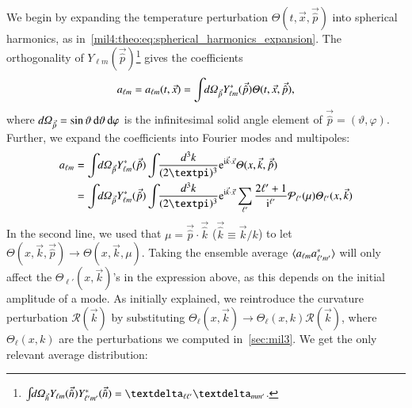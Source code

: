 We begin by expanding the temperature perturbation $\Theta(t, \vec{x}, \vec{\hat{p}})$ into spherical harmonics, as in~\cref{mil4:theo:eq:spherical_harmonics_expansion}.
The orthogonality of $Y_{\ell m}(\vec{\hat{p}})$\footnote{$\int \dOmg[n] Y\ellm(\vec{\hat{n}}) Y\ellmp^*(\vec{\hat{n}}) = \kroneckerdelta{\ell \ell'} \kroneckerdelta{m m'} $.} gives the coefficients
\begin{equation}
    a\ellm = a\ellm(t,\vec{x}) = \int \dOmg[p] Y^*_{\ell m} (\vec{\hat{p}}) \Theta(t, \vec{x}, \vec{\hat{p}}),
\end{equation}
where $d\varOmega_{\vec{\hat{p}}} = \sin{\vartheta} \diff \vartheta\diff \varphi$ is the infinitesimal solid angle element of $\vec{\hat{p}} = (\vartheta, \varphi)$. Further, we expand the coefficients into Fourier modes and multipoles:
\begin{equation}\label{mil4:theo:eq:a_ellm_expansions}
\begin{split}
    a_{\ell m} &= \int \dOmg[p] Y^*_{\ell m} (\vec{\hat{p}}) \int \dkkk \eu[\im \vec{k}\cdot \vec{x}] \Theta(x, \vec{k}, \vec{\hat{p}})  \\
    &= \int \dOmg[p] Y^*_{\ell m} (\vec{\hat{p}}) \int \dkkk \eu[\im \vec{k}\cdot \vec{x}]\sum_{\ell'} \frac{2\ell' + 1}{\im^{\ell'}} \mathcal{P}_{\ell'}(\mu) \Theta_{\ell'}(x, \vec{k})
\end{split}
\end{equation}
In the second line, we used that $\mu=\vec{\hat{p}}\cdot\vec{\hat{k}}$ ($\vec{\hat{k}}\equiv \vec{k}/k$) to let $\Theta(x,\vec{k}, \vec{\hat{p}}) \to\Theta(x,\vec{k},\mu) $. Taking the ensemble average $\langle a\ellm a^*\ellmp \rangle$ will only affect the $\Theta_{\ell'}(x, \vec{k})$'s in the expression above, as this depends on the initial amplitude of a mode. As initially explained, we reintroduce the curvature perturbation $\mathcal{R}(\vec{k})$ by substituting $\Theta_\ell(x,\vec{k}) \to \Theta_\ell(x,k) \mathcal{R}(\vec{k})$, where $\Theta_\ell(x, k)$ are the perturbations we computed in~\cref{sec:mil3}. We get the only relevant average distribution:

